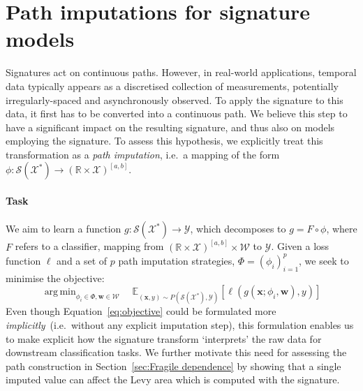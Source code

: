 \documentclass{article}
\DeclareMathOperator*{\argmin}{arg\,min}
\newcommand{\reals}{\mathbb{R}}
\newcommand{\dataspace}{\mathcal{X}}
\newcommand{\lspace}{\mathcal{Y}}
\newcommand{\seriesspace}{\mathcal{S}}
\begin{document}
\section{Path imputations for signature models}

Signatures act on continuous paths. However, in real-world
applications, temporal data typically appears as a discretised
collection of measurements, potentially irregularly-spaced and
asynchronously observed. To apply the signature to this data,
it first has to be converted into a continuous path. 
%
We believe this step to have a significant impact on the
resulting signature, and thus also on models employing the signature.
To assess this hypothesis, we explicitly treat this transformation
as a \emph{path imputation}, i.e.\ a mapping of the form $ \phi \colon \seriesspace(\dataspace^*) \to (\reals \times \dataspace)^{[a, b]}.$
%
\paragraph{Task} We aim to learn a function $ g \colon \seriesspace(\dataspace^*) \to
\lspace$, which decomposes to $g = F \circ \phi$, where $F$ refers to
a classifier, mapping from $(\reals \times \dataspace)^{[a, b]} \times \mathcal{W} $ to
$\lspace$. Given a loss function $\ell$ and a set of $p$ path
imputation strategies, ${\Phi} =(\phi_i)_{i=1}^p$, we seek to minimise the
objective:
%
\begin{equation}
    \argmin_{\phi_i \in \Phi, \mathbf{w} \in \mathcal{W}} \quad \mathbb{E}_{(\mathbf{x},y) \sim P(\seriesspace(\dataspace^*),\lspace) } \left[ \ell( g(\mathbf{x}; \phi_i, \mathbf{w}), y) \right]
    \label{eq:objective}
\end{equation} 
%
Even though Equation~\eqref{eq:objective} could be formulated more
\emph{implicitly}~(i.e.\ without any explicit imputation step),
this formulation enables us to make explicit how the signature transform
`interprets' the raw data for downstream classification tasks. We further motivate this need for assessing the path construction in Section~\ref{sec:Fragile dependence} by showing that a single imputed value can affect the Levy area which is computed with the signature. 
\end{document}
